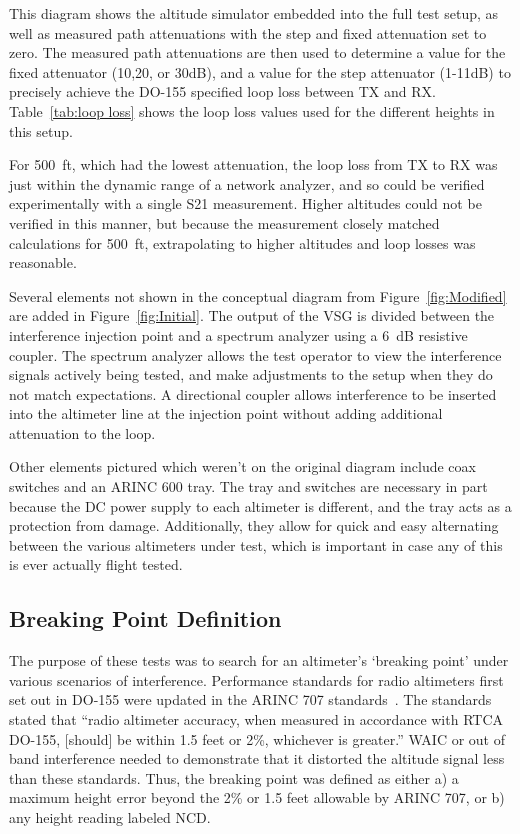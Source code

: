 This diagram shows the altitude simulator  embedded into the full test setup, as well as measured path attenuations with the step and fixed attenuation set to zero. The measured path attenuations are then used to determine a value for the fixed attenuator (10,20, or 30dB), and a value for the step attenuator (1-11dB) to precisely achieve the DO-155 specified loop loss between TX and RX. Table~\ref{tab:loop loss} shows the loop loss values used for the different heights in this setup. 

For 500~ft, which had the lowest attenuation, the loop loss from TX to RX was just within the dynamic range of a network analyzer, and so could be verified experimentally with a single S21 measurement. Higher altitudes could not be verified in this manner, but because the measurement closely matched calculations for 500~ft, extrapolating to higher altitudes and loop losses was reasonable. 

Several elements not shown in the conceptual diagram from Figure~\ref{fig:Modified} are added in Figure~\ref{fig:Initial}. The output of the VSG is divided between the interference injection point and a spectrum analyzer using a 6~dB resistive coupler. The spectrum analyzer allows the test operator to view the interference signals actively being tested, and make adjustments to the setup when they do not match expectations. A directional coupler allows interference to be inserted into the altimeter line at the injection point without adding additional attenuation to the loop. 

 Other elements pictured which weren't on the original diagram include coax switches and an ARINC 600 tray. The tray and switches are necessary in part because the DC power supply to each altimeter is different, and the tray acts as a protection from damage. Additionally, they allow for quick and easy alternating between the various altimeters under test, which is important in case any of this is ever actually flight tested. 

\subsection{Breaking Point Definition}

The purpose of these tests was to search for an altimeter's `breaking point' under various scenarios of interference. Performance standards for radio altimeters first set out in DO-155 were updated in the ARINC 707 standards~\cite{noauthor_arinc_2009}. The standards stated that ``radio altimeter accuracy, when measured in accordance with RTCA DO-155, [should] be within 1.5 feet or 2\%, whichever is greater.''  WAIC or out of band interference needed to demonstrate that it distorted the altitude signal less than these standards. Thus, the breaking point was defined as either a) a maximum height error beyond the 2\% or 1.5 feet allowable by ARINC 707, or b) any height reading labeled NCD. 

